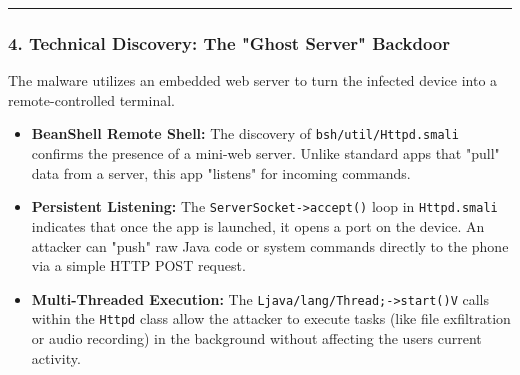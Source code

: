\documentclass[
]{article}
\begin{document}
\begin{center}\rule{0.5\linewidth}{0.5pt}\end{center}

\subsubsection{4. Technical Discovery: The "Ghost Server"
Backdoor}\label{4-technical-discovery-the-ghost-server-backdoor}

The malware utilizes an embedded web server to turn the infected device
into a remote-controlled terminal.

\begin{itemize}
\item
  \textbf{BeanShell Remote Shell:} The discovery of
  \texttt{bsh/util/Httpd.smali} confirms the presence of a mini-web
  server. Unlike standard apps that "pull" data from a server, this app
  "listens" for incoming commands.
\item
  \textbf{Persistent Listening:} The
  \texttt{ServerSocket-\textgreater{}accept()} loop in
  \texttt{Httpd.smali} indicates that once the app is launched, it opens
  a port on the device. An attacker can "push" raw Java code or system
  commands directly to the phone via a simple HTTP POST request.
\item
  \textbf{Multi-Threaded Execution:} The
  \texttt{Ljava/lang/Thread;-\textgreater{}start()V} calls within the
  \texttt{Httpd} class allow the attacker to execute tasks (like file
  exfiltration or audio recording) in the background without affecting
  the user\textquotesingle s current activity.
\end{itemize}
\end{document}
